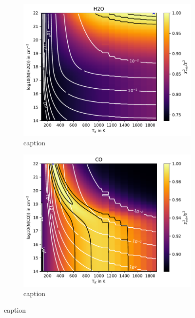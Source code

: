 \documentclass[oneside, single, authoryear, semicolon, 12pt]{lion-msc}
\newcommand{\4}{$_4$}
\newcommand{\3}{$_3$}
\newcommand{\2}{$_2$}
\begin{document}
\begin{figure}[!ht]
    \centering
    \begin{subfigure}[b]{0.49\textwidth}
        \centering
        \includegraphics[width=\textwidth]{radexpy_niels/Radexpy_for_Niels/chi2_map_H2O_V1094Sco.pdf}
        \caption{caption}
    \end{subfigure}
    \hfill
    \begin{subfigure}[b]{0.49\textwidth}
        \centering
        \includegraphics[width=\textwidth]{radexpy_niels/Radexpy_for_Niels/chi2_map_CO_V1094Sco.pdf}
        \caption{caption}
    \end{subfigure}
    \caption{caption}
\end{figure}
\end{document}

